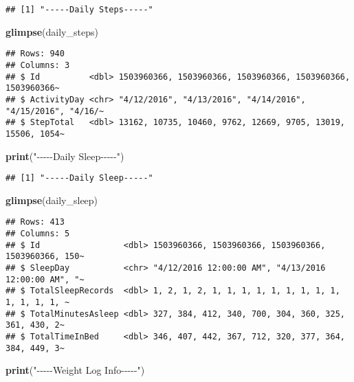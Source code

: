 \documentclass[
]{article}
\newenvironment{Shaded}{\begin{snugshade}}{\end{snugshade}}
\newcommand{\FunctionTok}[1]{\textcolor[rgb]{0.13,0.29,0.53}{\textbf{#1}}}
\newcommand{\NormalTok}[1]{#1}
\newcommand{\StringTok}[1]{\textcolor[rgb]{0.31,0.60,0.02}{#1}}
\begin{document}
\begin{verbatim}
## [1] "-----Daily Steps-----"
\end{verbatim}

\begin{Shaded}
\begin{Highlighting}[]
\FunctionTok{glimpse}\NormalTok{(daily\_steps)}
\end{Highlighting}
\end{Shaded}

\begin{verbatim}
## Rows: 940
## Columns: 3
## $ Id          <dbl> 1503960366, 1503960366, 1503960366, 1503960366, 1503960366~
## $ ActivityDay <chr> "4/12/2016", "4/13/2016", "4/14/2016", "4/15/2016", "4/16/~
## $ StepTotal   <dbl> 13162, 10735, 10460, 9762, 12669, 9705, 13019, 15506, 1054~
\end{verbatim}

\begin{Shaded}
\begin{Highlighting}[]
\FunctionTok{print}\NormalTok{(}\StringTok{"{-}{-}{-}{-}{-}Daily Sleep{-}{-}{-}{-}{-}"}\NormalTok{)}
\end{Highlighting}
\end{Shaded}

\begin{verbatim}
## [1] "-----Daily Sleep-----"
\end{verbatim}

\begin{Shaded}
\begin{Highlighting}[]
\FunctionTok{glimpse}\NormalTok{(daily\_sleep)}
\end{Highlighting}
\end{Shaded}

\begin{verbatim}
## Rows: 413
## Columns: 5
## $ Id                 <dbl> 1503960366, 1503960366, 1503960366, 1503960366, 150~
## $ SleepDay           <chr> "4/12/2016 12:00:00 AM", "4/13/2016 12:00:00 AM", "~
## $ TotalSleepRecords  <dbl> 1, 2, 1, 2, 1, 1, 1, 1, 1, 1, 1, 1, 1, 1, 1, 1, 1, ~
## $ TotalMinutesAsleep <dbl> 327, 384, 412, 340, 700, 304, 360, 325, 361, 430, 2~
## $ TotalTimeInBed     <dbl> 346, 407, 442, 367, 712, 320, 377, 364, 384, 449, 3~
\end{verbatim}

\begin{Shaded}
\begin{Highlighting}[]
\FunctionTok{print}\NormalTok{(}\StringTok{"{-}{-}{-}{-}{-}Weight Log Info{-}{-}{-}{-}{-}"}\NormalTok{)}
\end{Highlighting}
\end{Shaded}
\end{document}
